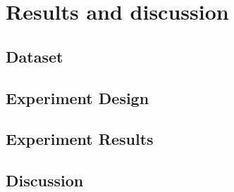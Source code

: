 \chapter{Results and discussion}

\section{Dataset}

\section{Experiment Design}

\section{Experiment Results}
    \label{sec:experiment_design}

\section{Discussion}
